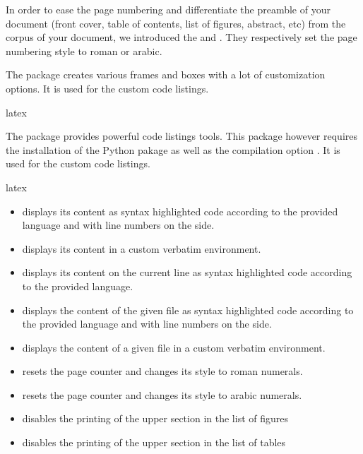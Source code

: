 \documentclass{report}
\begin{document}
In order to ease the page numbering and differentiate the preamble of your document (front cover, table of contents, list of figures, abstract, etc) from the corpus of your document, we introduced the  and . 
They respectively set the page numbering style to roman or arabic.




The  package creates various frames and boxes with a lot of customization options. 
It is used for the custom code listings.

\begin{imtaCode}{latex}
    \RequirePackage{mdframed}
\end{imtaCode}


The  package provides powerful code listings tools. This package however requires the installation of the Python pakage  as well as the compilation option . 
It is used for the custom code listings.

\begin{imtaCode}{latex}
    \RequirePackage{minted}
\end{imtaCode}



\begin{itemize}
    \item {} displays its content as syntax highlighted code according to the provided language and with line numbers on the side. 
    \item {} displays its content in a custom verbatim environment.
\end{itemize}


\begin{itemize}
    \item {} displays its content on the current line as syntax highlighted code according to the provided language.
    \item {} displays the content of the given file as syntax highlighted code according to the provided language and with line numbers on the side.
    \item {} displays the content of a given file in a custom verbatim environment.
    \item {} resets the page counter and changes its style to roman numerals.
    \item {} resets the page counter and changes its style to arabic numerals.
\end{itemize}


\begin{itemize}
    \item {} disables the printing of the upper section in the list of figures
    \item {} disables the printing of the upper section in the list of tables
\end{itemize}
\end{document}
